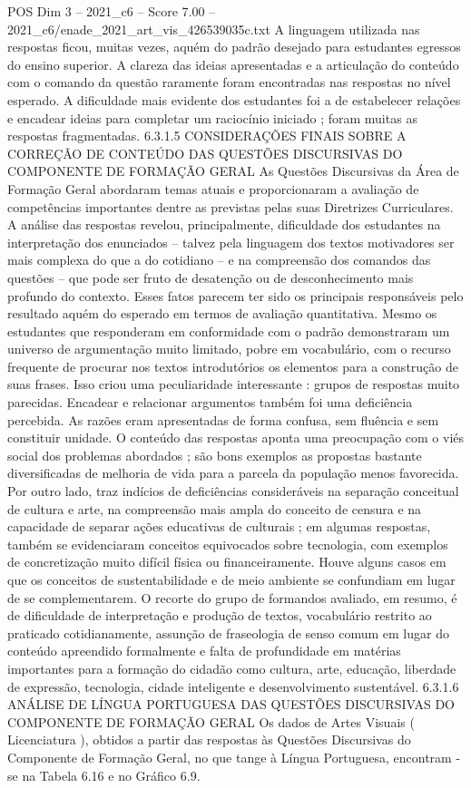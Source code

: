 \begin{textsample}{POS Dim 3 – 2021\_c6 – Score 7.00 – 2021\_c6/enade\_2021\_art\_vis\_426539035c.txt}
A linguagem utilizada nas respostas ficou, muitas vezes, aquém do padrão desejado para estudantes egressos do ensino superior.
A clareza das ideias apresentadas e a articulação do conteúdo com o comando da questão raramente foram encontradas nas respostas no nível esperado.
A dificuldade mais evidente dos estudantes foi a de estabelecer relações e encadear ideias para completar um raciocínio iniciado ; foram muitas as respostas fragmentadas. 6.3.1.5 CONSIDERAÇÕES FINAIS SOBRE A CORREÇÃO DE CONTEÚDO DAS QUESTÕES DISCURSIVAS DO COMPONENTE DE FORMAÇÃO GERAL As Questões Discursivas da Área de Formação Geral abordaram temas atuais e proporcionaram a avaliação de competências importantes dentre as previstas pelas suas Diretrizes Curriculares.
A análise das respostas revelou, principalmente, dificuldade dos estudantes na interpretação dos enunciados – talvez pela linguagem dos textos motivadores ser mais complexa do que a do cotidiano – e na compreensão dos comandos das questões – que pode ser fruto de desatenção ou de desconhecimento mais profundo do contexto.
Esses fatos parecem ter sido os principais responsáveis pelo resultado aquém do esperado em termos de avaliação quantitativa.
Mesmo os estudantes que responderam em conformidade com o padrão demonstraram um universo de argumentação muito limitado, pobre em vocabulário, com o recurso frequente de procurar nos textos introdutórios os elementos para a construção de suas frases.
Isso criou uma peculiaridade interessante : grupos de respostas muito parecidas.
Encadear e relacionar argumentos também foi uma deficiência percebida.
As razões eram apresentadas de forma confusa, sem fluência e sem constituir unidade.
O conteúdo das respostas aponta uma preocupação com o viés social dos problemas abordados ; são bons exemplos as propostas bastante diversificadas de melhoria de vida para a parcela da população menos favorecida.
Por outro lado, traz indícios de deficiências consideráveis na separação conceitual de cultura e arte, na compreensão mais ampla do conceito de censura e na capacidade de separar ações educativas de culturais ; em algumas respostas, também se evidenciaram conceitos equivocados sobre tecnologia, com exemplos de concretização muito difícil física ou financeiramente.
Houve alguns casos em que os conceitos de sustentabilidade e de meio ambiente se confundiam em lugar de se complementarem.
O recorte do grupo de formandos avaliado, em resumo, é de dificuldade de interpretação e produção de textos, vocabulário restrito ao praticado cotidianamente, assunção de fraseologia de senso comum em lugar do conteúdo apreendido formalmente e falta de profundidade em matérias importantes para a formação do cidadão como cultura, arte, educação, liberdade de expressão, tecnologia, cidade inteligente e desenvolvimento sustentável. 6.3.1.6 ANÁLISE DE LÍNGUA PORTUGUESA DAS QUESTÕES DISCURSIVAS DO COMPONENTE DE FORMAÇÃO GERAL Os dados de Artes Visuais ( Licenciatura ), obtidos a partir das respostas às Questões Discursivas do Componente de Formação Geral, no que tange à Língua Portuguesa, encontram -se na Tabela 6.16 e no Gráfico 6.9.

\end{textsample}
